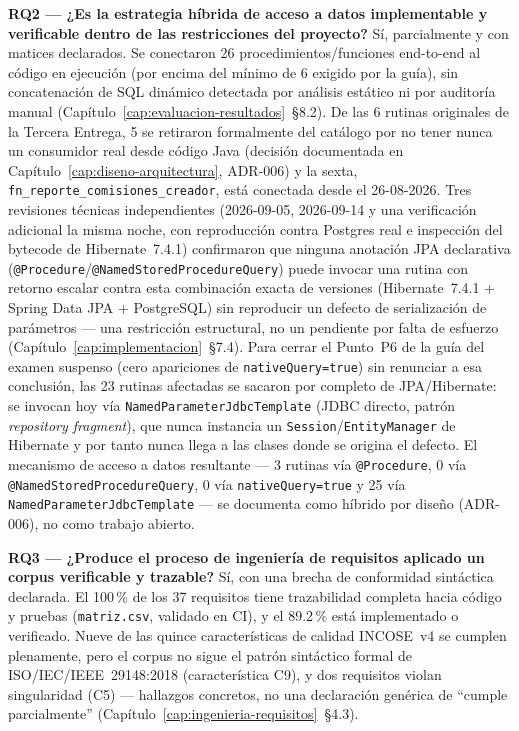\textbf{RQ2 --- ¿Es la estrategia híbrida de acceso a datos implementable
y verificable dentro de las restricciones del proyecto?} Sí, parcialmente
y con matices declarados. Se conectaron 26 procedimientos/funciones
end-to-end al código en ejecución (por encima del mínimo de 6 exigido por
la guía), sin concatenación de SQL dinámico detectada por análisis
estático ni por auditoría manual (Capítulo~\ref{cap:evaluacion-resultados}~\S8.2).
De las 6 rutinas originales de la Tercera Entrega, 5 se retiraron
formalmente del catálogo por no tener nunca un consumidor real desde
código Java (decisión documentada en
Capítulo~\ref{cap:diseno-arquitectura}, ADR-006) y la sexta,
\texttt{fn\_reporte\_comisiones\_creador}, está conectada desde el
26-08-2026. Tres revisiones técnicas independientes (2026-09-05,
2026-09-14 y una verificación adicional la misma noche, con reproducción
contra Postgres real e inspección del bytecode de Hibernate~7.4.1)
confirmaron que ninguna anotación JPA declarativa
(\texttt{@Procedure}/\texttt{@NamedStoredProcedureQuery}) puede invocar
una rutina con retorno escalar contra esta combinación exacta de
versiones (Hibernate~7.4.1 + Spring Data JPA + PostgreSQL) sin
reproducir un defecto de serialización de parámetros --- una restricción
estructural, no un pendiente por falta de esfuerzo
(Capítulo~\ref{cap:implementacion}~\S7.4). Para cerrar el Punto~P6 de la
guía del examen suspenso (cero apariciones de \texttt{nativeQuery=true})
sin renunciar a esa conclusión, las 23 rutinas afectadas se sacaron por
completo de JPA/Hibernate: se invocan hoy vía
\texttt{NamedParameterJdbcTemplate} (JDBC directo, patrón \textit{repository
fragment}), que nunca instancia un \texttt{Session}/\texttt{EntityManager}
de Hibernate y por tanto nunca llega a las clases donde se origina el
defecto. El mecanismo de acceso a datos resultante --- 3 rutinas vía
\texttt{@Procedure}, 0 vía \texttt{@NamedStoredProcedureQuery}, 0 vía
\texttt{nativeQuery=true} y 25 vía \texttt{NamedParameterJdbcTemplate} ---
se documenta como híbrido por diseño (ADR-006), no como trabajo abierto.

\textbf{RQ3 --- ¿Produce el proceso de ingeniería de requisitos aplicado
un corpus verificable y trazable?} Sí, con una brecha de conformidad
sintáctica declarada. El 100\,\% de los 37 requisitos tiene trazabilidad
completa hacia código y pruebas (\texttt{matriz.csv}, validado en CI), y
el 89.2\,\% está implementado o verificado. Nueve de las quince
características de calidad INCOSE~v4 se cumplen plenamente, pero el
corpus no sigue el patrón sintáctico formal de
ISO/IEC/IEEE~29148:2018 (característica C9), y dos requisitos violan
singularidad (C5) --- hallazgos concretos, no una declaración genérica de
``cumple parcialmente'' (Capítulo~\ref{cap:ingenieria-requisitos}~\S4.3).

